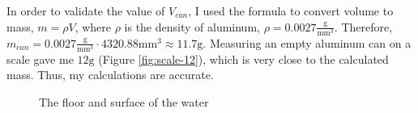 \documentclass[11pt]{article}
\begin{document}
    In order to validate the value of $V_{can}$, I used the formula to convert volume to mass, $m = \rho V$, where $\rho$ is the density of aluminum, $\rho = 0.0027 \frac{\mathrm{g}}{\mathrm{mm}^3}$. Therefore, $m_{can} = 0.0027 \frac{\mathrm{g}}{\mathrm{mm}^3} \cdot 4320.88 \mathrm{mm}^3 \approx 11.7 \mathrm{g}$. Measuring an empty aluminum can on a scale gave me $12 \mathrm{g}$ (Figure \ref{fig:scale-12}), which is very close to the calculated mass. Thus, my calculations are accurate.

    \begin{figure}
        \centering
        \vspace{-10pt}
        \caption{The floor and surface of the water}
        \label{fig:floor}
    \end{figure}
\end{document}
